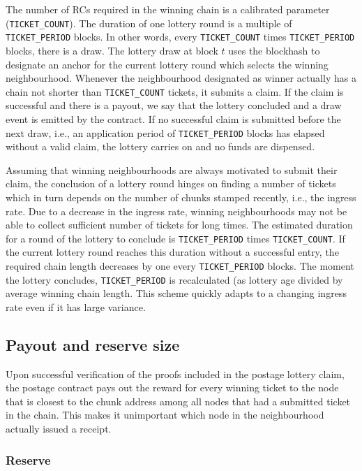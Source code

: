 The number of RCs required in the winning chain is a calibrated parameter (\texttt{TICKET\_COUNT}).  The duration of one lottery round is a multiple of \texttt{TICKET\_PERIOD} blocks. In other words, every \texttt{TICKET\_COUNT} times \texttt{TICKET\_PERIOD} blocks, there is a draw. The lottery draw at block $t$ uses the blockhash to designate an anchor for the current lottery round which selects the winning neighbourhood. Whenever the neighbourhood designated as winner actually has a chain not shorter than \texttt{TICKET\_COUNT} tickets, it submits a claim. If the claim is successful and there is a payout, we say that the lottery concluded and a draw event is emitted by the contract. If no successful claim is submitted before the next draw, i.e., an application period of \texttt{TICKET\_PERIOD} blocks has elapsed without a valid claim, the lottery carries on and no funds are dispensed.

Assuming that winning neighbourhoods are always motivated to submit their claim, the conclusion of a lottery round hinges on finding a number of tickets which in turn depends on the number of chunks stamped recently, i.e., the ingress rate. Due to a decrease in the ingress rate, winning neighbourhoods may not be able to collect sufficient number of tickets for long times. The estimated duration for a round of the lottery to conclude is \texttt{TICKET\_PERIOD} times \texttt{TICKET\_COUNT}. If the current lottery round reaches this duration without a successful entry, the required chain length decreases by one every \texttt{TICKET\_PERIOD} blocks. The moment the lottery concludes, \texttt{TICKET\_PERIOD} is recalculated (as lottery age divided by average winning chain length. 
This scheme quickly adapts to a changing ingress rate even if it has large variance.

\subsection{Payout and reserve size}

Upon successful verification of the proofs included in the postage lottery claim, the postage contract pays out the reward for every winning ticket to the node that is closest to the chunk address among all nodes that had a submitted ticket in the chain.
This makes it unimportant which node in the neighbourhood actually issued a receipt.

\subsubsection{Reserve}

